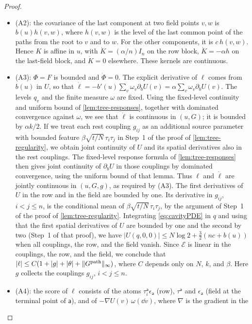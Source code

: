 \begin{proof}
\begin{itemize}
\item \textup{(A2)}: the covariance of the last component at two field
points $v,w$ is $b(u)h(v,w)$, where $h(v,w)$ is the level of the last
common point of the paths from the root to $v$ and to $w$. For the other
components, it is $c\,h(v,w)$. Hence $K$ is affine in $u$, with
$\dot K=(\alpha/n)I_n$ on the row block, $\dot K=-\alpha h$ on the
last-field block, and $\dot K=0$ elsewhere. These kernels are
continuous.
\item \textup{(A3)}: $\Phi=F$ is bounded and $\dot\Phi=0$. The explicit
derivative of $\ell$ comes from $b(u)$ in $U$, so that
$\dot\ell=-b'(u)\sum_v\omega_v\partial_bU(v)=\alpha\sum_v\omega_v
\partial_bU(v)$. The levels $q_v$ and the finite measure $\omega$ are
fixed. Using the fixed-level continuity and uniform bound of
\cref{lem:tree-responses}, together with dominated convergence against $\omega$, we see
that $\dot\ell$ is continuous in $(u,G)$; it is bounded by $\alpha k/2$.
If we treat each rest coupling $g_{ij}$ as an additional source parameter
with bounded feature $\beta\sqrt{t/N}\,\tau_i\tau_j$ in Step~1 of the proof of
\cref{lem:tree-regularity}, we obtain joint continuity of $U$ and its spatial
derivatives also in the rest couplings. The fixed-level response formula
of \cref{lem:tree-responses} then gives joint continuity of $\partial_bU$
in those couplings by dominated convergence, using the uniform bound of
that lemma.
Thus $\ell$ and $\dot\ell$ are jointly continuous in $(u,G,g)$, as required
by \textup{(A3)}.
The first derivatives of $U$ in
the row and in the field are bounded by one. Its derivative in $g_{ij}$,
$i<j\le n$, is the conditional mean of $\beta\sqrt{t/N}\,\tau_i\tau_j$,
by the argument of Step~1 of the proof of \cref{lem:tree-regularity}.
Integrating \eqref{eq:cavityPDE} in $q$ and using that the first spatial
derivatives of $U$ are bounded by one and the second by two (Step~1 of that
proof), we have $|U(q,0,0)|\le N\log2+\frac32(nc+b(u))$
when all couplings, the row, and the field vanish.
Since $\mathcal E$ is linear in the couplings, the row, and the field, we
conclude that $|\ell|\le C(1+|g|+|\theta|+\|G^{\rm path}\|_\infty)$, where
$C$ depends only on $N$, $k$, and $\beta$. Here $g$ collects the couplings
$g_{ij}$, $i<j\le n$.
\item \textup{(A4)}: the score of $\ell$ consists of the atoms
$\tau_i^{\mathsf a}\epsilon_{\mathsf a}$ (row), $\tau^{\mathsf a}$ and
$\epsilon_{\mathsf a}$ (field at the terminal point of $\mathsf a$), and
of $-\nabla U(v)\,\omega(\dd v)$, where $\nabla$ is the gradient in the

\end{itemize}
\end{proof}
